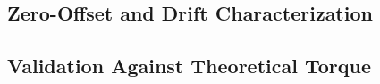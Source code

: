 \subsection{Zero-Offset and Drift Characterization}
\label{subsec:agit-torque-drift}


\subsection{Validation Against Theoretical Torque}
\label{subsec:agit-torque-test}

